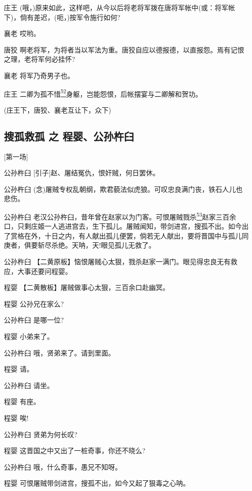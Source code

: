 庄王
(哦，)原来如此，这样吧，从今以后将老将军拨在唐将军帐中(或：将军帐下)，倘有差迟，(呃，)按军令施行如何?

襄老 哎哟。

唐狡
啊老将军，为将者当以军法为重。唐狡自应以德报德，以直报怨。焉有记恨之理，老将军何必挂怀?

襄老 将军乃奇男子也。

庄王
二卿为孤不惜\protect\hyperlink{fn52}{\textsuperscript{52}}身躯，岂能怨恨，后帐摆宴与二卿解和贺功。

(庄王下，唐狡、襄老互让下，众下)

\newpage
\hypertarget{ux641cux5b64ux6551ux5b64-ux4e4b-ux7a0bux5a74ux516cux5b59ux6775ux81fc}{%
\subsection{搜孤救孤 之
程婴、公孙杵臼}\label{ux641cux5b64ux6551ux5b64-ux4e4b-ux7a0bux5a74ux516cux5b59ux6775ux81fc}}

{[}第一场{]}

公孙杵臼 {[}引子{]}赵、屠结冤仇，恨奸贼，何日罢休。

公孙杵臼
(念)屠贼专权乱朝纲，欺君藐法似虎狼。可叹忠良满门丧，铁石人儿也悲伤。

公孙杵臼
老汉公孙杵臼，昔年曾在赵家以为门客。可恨屠贼戮杀\protect\hyperlink{fn53}{\textsuperscript{53}}赵家三百余口，只剩庄姬一人逃进宫去，生下孤儿。屠贼闻知，带剑进宫，搜孤不出。如今出了赏格在外，十日之内，有人献出孤儿便罢，倘若无人献出，要将晋国中与孤儿同庚者，俱要斩尽杀绝。天呐，天!眼见孤儿无救了。

公孙杵臼
【二黄原板】恼恨屠贼心太狠，戮杀赵家一满门。眼见得忠良无有救应，大事还要问程婴。

程婴 【二黄散板】屠贼做事心太狠，三百余口赴幽冥。

程婴 公孙兄在家么?

公孙杵臼 是哪一位?

程婴 小弟来了。

公孙杵臼 哦，贤弟来了。请到里面。

程婴 请。

公孙杵臼 请坐。

程婴 有座。

程婴 唉!

公孙杵臼 贤弟为何长叹?

程婴 这晋国之中又出了一桩奇事，你还不晓么?

公孙杵臼 哦，什么奇事，愚兄不知呀。

程婴 可恨屠贼带剑进宫，搜孤不出，如今又起了狠毒之心呐。

